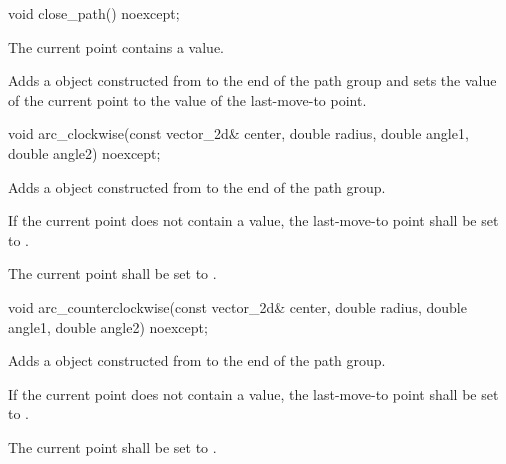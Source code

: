 \begin{itemdecl}
    void close_path() noexcept;
\end{itemdecl}
\begin{itemdescr}
	\pnum
	\requires
	The current point contains a value.
	
	\pnum
	\effects
	Adds a  object constructed from  to the end of the path group and sets the value of the current point to the value of the last-move-to point.
\end{itemdescr}

\begin{itemdecl}
    void arc_clockwise(const vector_2d& center, double radius, double angle1,
      double angle2) noexcept;
\end{itemdecl}
\begin{itemdescr}
	\pnum
	\effects
	Adds a  object constructed from  to the end of the path group.
	
	\pnum
	If the current point does not contain a value, the last-move-to point shall be set to .
	
	\pnum
	The current point shall be set to .
\end{itemdescr}

\begin{itemdecl}
    void arc_counterclockwise(const vector_2d& center, double radius,
      double angle1, double angle2) noexcept;
\end{itemdecl}
\begin{itemdescr}
	\pnum
	\effects
	Adds a  object constructed from  to the end of the path group.
	
	\pnum
	If the current point does not contain a value, the last-move-to point shall be set to .
	
	\pnum
	The current point shall be set to .
\end{itemdescr}

